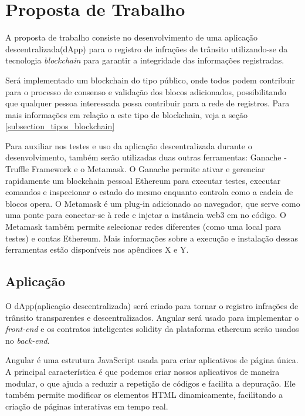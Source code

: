 \chapter[Proposta de Trabalho]{Proposta de Trabalho}


A proposta de trabalho consiste no desenvolvimento de uma aplicação descentralizada(dApp) para o registro de infrações de trânsito utilizando-se da tecnologia \textit{blockchain} para garantir a integridade das informações registradas. 

Será implementado um blockchain do tipo público, onde todos podem contribuir para o processo de consenso e validação dos blocos adicionados, possibilitando que qualquer pessoa interessada possa contribuir para a rede de registros. Para mais informações em relação a este tipo de blockchain, veja a seção \ref{subsection_tipos_blockchain}

Para auxiliar nos testes e uso da aplicação descentralizada durante o desenvolvimento, também serão utilizadas duas outras ferramentas: Ganache - Truffle Framework e o Metamask. O Ganache permite ativar e gerenciar rapidamente um blockchain pessoal Ethereum para executar testes, executar comandos e inspecionar o estado do mesmo enquanto controla como a cadeia de blocos opera. O Metamask é um plug-in adicionado ao navegador, que serve como uma ponte para conectar-se à rede e injetar a instância web3 em no código. O Metamask também permite selecionar redes diferentes (como uma local para testes) e contas Ethereum.
Mais informações sobre a execução e instalação dessas ferramentas estão disponíveis nos apêndices X e Y.


\section{Aplicação}

O dApp(aplicação descentralizada) será criado para tornar o registro infrações de trânsito transparentes e descentralizados. Angular será usado para implementar o \textit{front-end} e os contratos inteligentes solidity da plataforma ethereum serão usados no \textit{back-end}. 

Angular é uma estrutura JavaScript usada para criar aplicativos de página única. A principal característica é que podemos criar nossos aplicativos de maneira modular, o que ajuda a reduzir a repetição de códigos e facilita a depuração. Ele também permite modificar os elementos HTML dinamicamente, facilitando a criação de páginas interativas em tempo real. 


